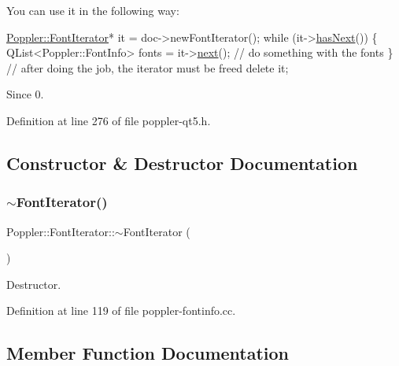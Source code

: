 You can use it in the following way\+: 
\begin{DoxyCode}
\hyperlink{class_poppler_1_1_font_iterator}{Poppler::FontIterator}* it = doc->newFontIterator();
\textcolor{keywordflow}{while} (it->\hyperlink{class_poppler_1_1_font_iterator_a7a3dde96c97c99d1997429e85a4d8451}{hasNext}()) \{
  QList<Poppler::FontInfo> fonts = it->\hyperlink{class_poppler_1_1_font_iterator_ab33e290dff2467cda4c9ce87a6c5398e}{next}();
  \textcolor{comment}{// do something with the fonts}
\}
\textcolor{comment}{// after doing the job, the iterator must be freed}
\textcolor{keyword}{delete} it;
\end{DoxyCode}


\begin{DoxySince}{Since}
0. 
\end{DoxySince}


Definition at line 276 of file poppler-\/qt5.\+h.



\subsection{Constructor \& Destructor Documentation}
\mbox{\label{class_poppler_1_1_font_iterator_a7496bc5fe5e6b15b213ac8028d8c4ca3}} 
\subsubsection{\texorpdfstring{$\sim$\+Font\+Iterator()}{~FontIterator()}}
{\footnotesize\ttfamily Poppler\+::\+Font\+Iterator\+::$\sim$\+Font\+Iterator (\begin{DoxyParamCaption}{ }\end{DoxyParamCaption})}

Destructor. 

Definition at line 119 of file poppler-\/fontinfo.\+cc.



\subsection{Member Function Documentation}
\mbox{\label{class_poppler_1_1_font_iterator_a4a4284eb806e31930585e9550e31a41b}} 
